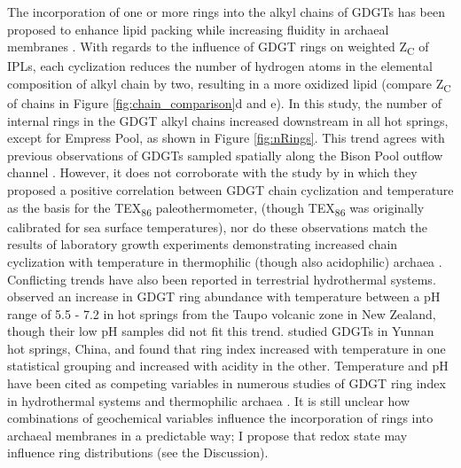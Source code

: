 The incorporation of one or more rings into the alkyl chains of GDGTs has been proposed to enhance lipid packing while increasing fluidity in archaeal membranes \citep{sollich2017heat}. With regards to the influence of GDGT rings on weighted Z\textsubscript{C} of IPLs, each cyclization reduces the number of hydrogen atoms in the elemental composition of alkyl chain by two, resulting in a more oxidized lipid (compare Z\textsubscript{C} of chains in Figure \ref{fig:chain_comparison}d and e). In this study, the number of internal rings in the GDGT alkyl chains increased downstream in all hot springs, except for Empress Pool, as shown in Figure \ref{fig:nRings}. This trend agrees with previous observations of GDGTs sampled spatially along the Bison Pool outflow channel \citep{schubotz2013spatial}. However, it does not corroborate with the study by \cite{schouten2002distributional} in which they proposed a positive correlation between GDGT chain cyclization and temperature as the basis for the TEX\textsubscript{86} paleothermometer, (though TEX\textsubscript{86} was originally calibrated for sea surface temperatures), nor do these observations match the results of laboratory growth experiments demonstrating increased chain cyclization with temperature in thermophilic (though also acidophilic) archaea \citep{boyd2011temperature}. Conflicting trends have also been reported in terrestrial hydrothermal systems. \cite{kaur2015temperature} observed an increase in GDGT ring abundance with temperature between a pH range of 5.5 - 7.2 in hot springs from the Taupo volcanic zone in New Zealand, though their low pH samples did not fit this trend. \cite{wu2013impacts} studied GDGTs in Yunnan hot springs, China, and found that ring index increased with temperature in one statistical grouping and increased with acidity in the other. Temperature and pH have been cited as competing variables in numerous studies of GDGT ring index in hydrothermal systems and thermophilic archaea \citep{boyd2013role, pearson2008factors, boyd2011temperature}. It is still unclear how combinations of geochemical variables influence the incorporation of rings into archaeal membranes in a predictable way; I propose that redox state may influence ring distributions (see the Discussion).




